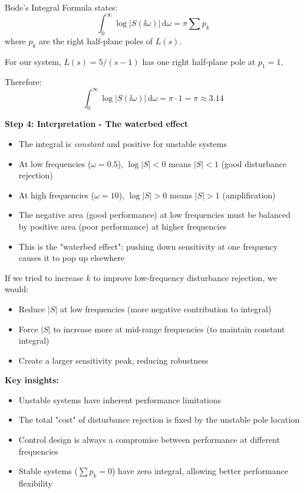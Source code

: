 \documentclass[11pt,a4paper]{article}
\begin{document}
Bode's Integral Formula states:
\[
\int_0^\infty \log|S(\ii\omega)|\,\mathrm{d}\omega = \pi \sum p_k
\]
where $p_k$ are the right half-plane poles of $L(s)$.

For our system, $L(s) = 5/(s-1)$ has one right half-plane pole at $p_1 = 1$.

Therefore:
\[
\int_0^\infty \log|S(\ii\omega)|\,\mathrm{d}\omega = \pi \cdot 1 = \pi \approx 3.14
\]

\textbf{Step 4: Interpretation - The waterbed effect}

\begin{itemize}
\item The integral is \emph{constant} and positive for unstable systems
\item At low frequencies ($\omega = 0.5$), $\log|S| < 0$ means $|S| < 1$ (good disturbance rejection)
\item At high frequencies ($\omega = 10$), $\log|S| > 0$ means $|S| > 1$ (amplification)
\item The negative area (good performance) at low frequencies must be balanced by positive area (poor performance) at higher frequencies
\item This is the "waterbed effect": pushing down sensitivity at one frequency causes it to pop up elsewhere
\end{itemize}

If we tried to increase $k$ to improve low-frequency disturbance rejection, we would:
\begin{itemize}
\item Reduce $|S|$ at low frequencies (more negative contribution to integral)
\item Force $|S|$ to increase more at mid-range frequencies (to maintain constant integral)
\item Create a larger sensitivity peak, reducing robustness
\end{itemize}

\textbf{Key insights:}
\begin{itemize}
\item Unstable systems have inherent performance limitations
\item The total "cost" of disturbance rejection is fixed by the unstable pole location
\item Control design is always a compromise between performance at different frequencies
\item Stable systems ($\sum p_k = 0$) have zero integral, allowing better performance flexibility
\end{itemize}
\end{document}
